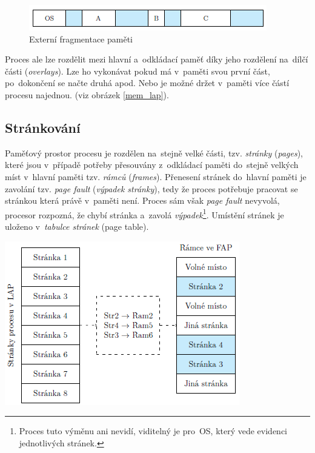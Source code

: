 \begin{figure}[ht]
	\centering
	\includegraphics[scale=1]{images/mem_fragmentace.png}
	\caption{Externí fragmentace paměti}
	\label{mem_fragmentace}
\end{figure}

Proces ale lze rozdělit mezi hlavní a~odkládací paměť díky jeho rozdělení na~dílčí části (\emph{overlays}). Lze ho vykonávat pokud má v~paměti svou první část, po~dokončení se načte druhá apod. Nebo je možné držet v~paměti více částí procesu najednou. (viz obrázek \ref{mem_lap}).

\subsection{Stránkování}

Paměťový prostor procesu je rozdělen na~stejně velké části, tzv. \emph{stránky} (\emph{pages}), které jsou v~případě potřeby přesouvány z~odkládací paměti do~stejně velkých míst v~hlavní paměti tzv. \emph{rámců} (\emph{frames}). Přenesení stránek do~hlavní paměti je zavolání tzv. \emph{page fault} (\emph{výpadek stránky}), tedy že proces potřebuje pracovat se stránkou která právě v~paměti není. Proces sám však \emph{page fault} nevyvolá, procesor rozpozná, že chybí stránka a~zavolá \emph{výpadek}\footnote{Proces tuto výměnu ani nevidí, viditelný je pro~OS, který vede evidenci jednotlivých stránek.}. Umístění stránek je uloženo v~\emph{tabulce stránek} (page table).

\begin{center}
	\includegraphics[scale=1]{images/mem_page_table.png}
\end{center}

